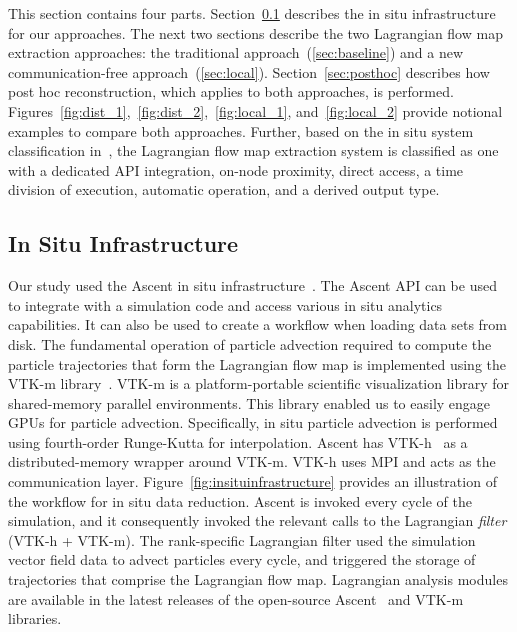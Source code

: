 This section contains four parts.
%
Section~\ref{sec:insituinfrastructure} describes the in situ infrastructure for our approaches.
%
The next two sections describe the two Lagrangian flow map extraction approaches:
the traditional approach~(\ref{sec:baseline}) and a new communication-free approach~(\ref{sec:local}).
%
Section~\ref{sec:posthoc} describes how post hoc reconstruction, which applies to both approaches, is performed.
%
{Figures~\ref{fig:dist_1},~\ref{fig:dist_2},~\ref{fig:local_1}, and~\ref{fig:local_2} provide notional examples to compare both approaches.}
%
Further, based on the in situ system classification in~\cite{childs2020istp}, the Lagrangian flow map extraction system is classified as one with a dedicated API integration, on-node proximity, direct access, a time division of execution, automatic operation, and a derived output type.

\vspace{-2mm}
\subsection{In Situ Infrastructure}
\label{sec:insituinfrastructure}
Our study used the Ascent in situ infrastructure~\cite{Larsen2017Ascent}.
%
The Ascent API can be used to integrate with a simulation code and access various in situ analytics capabilities.
%
It can also be used to create a workflow when loading data sets from disk.
%
The fundamental operation of particle advection required to compute the particle trajectories that form the Lagrangian flow map is implemented using the VTK-m library~\cite{moreland2016vtk}.
%
VTK-m is a platform-portable scientific visualization library for shared-memory parallel environments. 
%
This library enabled us to easily engage GPUs for particle advection.
%
Specifically, in situ particle advection is performed using fourth-order Runge-Kutta for interpolation.
%
Ascent has VTK-h~\cite{Larsen2017Ascent} as a distributed-memory wrapper around VTK-m.
%
VTK-h uses MPI and acts as the communication layer.
%
Figure~\ref{fig:insituinfrastructure} provides an illustration of the workflow for in situ data reduction.
%
Ascent is invoked every cycle of the simulation, and it consequently invoked the relevant calls to the Lagrangian \textit{filter} (VTK-h + VTK-m).
%
The rank-specific Lagrangian filter used the simulation vector field data to advect particles every cycle, and triggered the storage of trajectories that comprise the Lagrangian flow map. 
%
{Lagrangian analysis modules are available in the latest releases of the open-source Ascent~\cite{Larsen2017Ascent} and VTK-m~\cite{moreland2016vtk} libraries.}
%



